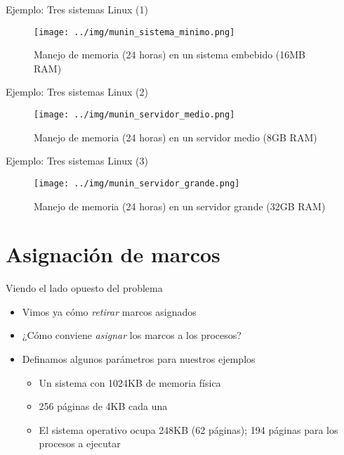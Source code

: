 \documentclass[presentation]{beamer}
\begin{document}
\begin{frame}[label={sec:orgdac43d3}]{Ejemplo: Tres sistemas Linux (1)}
\begin{figure}[htbp]
\centering
\texttt{[image: ../img/munin\_sistema\_minimo.png]}
\caption{Manejo de memoria (24 horas) en un sistema embebido (16MB RAM)}
\end{figure}
\end{frame}


\begin{frame}[label={sec:org852bf0b}]{Ejemplo: Tres sistemas Linux (2)}
\begin{figure}[htbp]
\centering
\texttt{[image: ../img/munin\_servidor\_medio.png]}
\caption{Manejo de memoria (24 horas) en un servidor medio (8GB RAM)}
\end{figure}
\end{frame}

\begin{frame}[label={sec:org1306da4}]{Ejemplo: Tres sistemas Linux (3)}
\begin{figure}[htbp]
\centering
\texttt{[image: ../img/munin\_servidor\_grande.png]}
\caption{Manejo de memoria (24 horas) en un servidor grande (32GB RAM)}
\end{figure}
\end{frame}

\section{Asignación de marcos}
\label{sec:orgd68d77a}
\begin{frame}[label={sec:orge514aa5}]{Viendo el lado opuesto del problema}
\begin{itemize}
\item Vimos ya cómo \emph{retirar} marcos asignados
\item ¿Cómo conviene \emph{asignar} los marcos a los procesos?
\item Definamos algunos parámetros para nuestros ejemplos
\begin{itemize}
\item Un sistema con 1024KB de memoria física
\item 256 páginas de 4KB cada una
\item El sistema operativo ocupa 248KB (62 páginas); 194 páginas para
los procesos a ejecutar
\end{itemize}
\end{itemize}
\end{frame}
\end{document}
